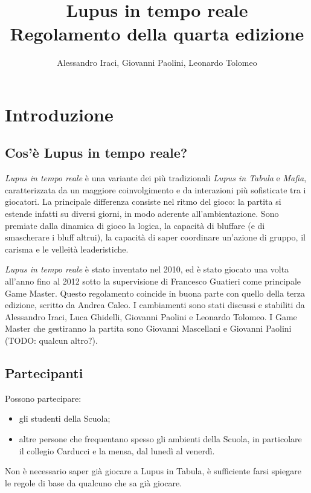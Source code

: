 \documentclass[a4paper,10pt]{article}
\title{Lupus in tempo reale\\ Regolamento della quarta edizione}
\author{Alessandro Iraci, Giovanni Paolini, Leonardo Tolomeo}
\begin{document}
\maketitle


\section{Introduzione}

\subsection{Cos'è Lupus in tempo reale?}

\emph{Lupus in tempo reale} è una variante dei più tradizionali \emph{Lupus in Tabula} e \emph{Mafia}, caratterizzata da un maggiore coinvolgimento e da interazioni più sofisticate tra i giocatori.
La principale differenza consiste nel ritmo del gioco: la partita si estende infatti su diversi giorni, in modo aderente all'ambientazione.
Sono premiate dalla dinamica di gioco la logica, la capacità di bluffare (e di smascherare i bluff altrui), la capacità di saper coordinare un’azione di gruppo, il carisma e le velleità leaderistiche.

\emph{Lupus in tempo reale} è stato inventato nel 2010, ed è stato giocato una volta all'anno fino al 2012 sotto la supervisione di Francesco Guatieri come principale Game Master.
Questo regolamento coincide in buona parte con quello della terza edizione, scritto da Andrea Caleo.
I cambiamenti sono stati discussi e stabiliti da Alessandro Iraci, Luca Ghidelli, Giovanni Paolini e Leonardo Tolomeo.
I Game Master che gestiranno la partita sono Giovanni Mascellani e Giovanni Paolini (TODO: qualcun altro?).


\subsection{Partecipanti}

Possono partecipare:
\begin{itemize}
 \item gli studenti della Scuola;
 \item altre persone che frequentano spesso gli ambienti della Scuola, in particolare il collegio Carducci e la mensa, dal lunedì al venerdì.
\end{itemize}

Non è necessario saper già giocare a Lupus in Tabula, è sufficiente farsi spiegare le regole di base da qualcuno che sa già giocare.
\end{document}
